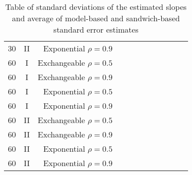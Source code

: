 \documentclass[11pt, letterpaper]{article}
\begin{document}
\begin{table}
\begin{tabular}{ccr|ccc|ccc|ccc}
30 & II &         Exponential $\rho=0.9$ &  \\ [2ex]
60 &  I & Exchangeable $\rho=0.5$ &  \\
60 &  I & Exchangeable $\rho=0.9$ &  \\
60 &  I &         Exponential $\rho=0.5$ &  \\
60 &  I &        Exponential $\rho=0.9$ &  \\ [1ex]
60 & II & Exchangeable $\rho=0.5$ &  \\
60 & II & Exchangeable $\rho=0.9$ &  \\
60 & II &         Exponential $\rho=0.5$ &  \\
60 & II &         Exponential $\rho=0.9$ & 
\end{tabular}
\caption{Table of standard deviations of the estimated slopes and 
  average of model-based and sandwich-based standard error estimates}
\label{tab:p1_results}
\end{table}
\end{document}
